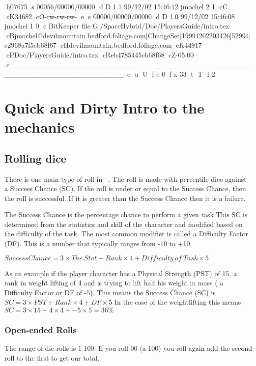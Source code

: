 h07675
s 00056/00000/00000
d D 1.1 99/12/02 15:46:12 jmochel 2 1
cC
cK34682
cO-rw-rw-rw-
e
s 00000/00000/00000
d D 1.0 99/12/02 15:46:08 jmochel 1 0
c BitKeeper file G:/SpaceHybrid/Doc/PlayersGuide/intro.tex
cBjmochel@devilmountain.bedford.foliage.com|ChangeSet|19991202203126|52994|e2968a7f5cb68f67
cHdevilmountain.bedford.foliage.com
cK44917
cPDoc/PlayersGuide/intro.tex
cReb4785445cb68f68
cZ-05:00
c______________________________________________________________________
e
u
U
f e 0
f x 33
t
T
I 2
\chapter{Quick and Dirty Intro to the mechanics}

\section{Rolling dice}

There is one main type of roll in \SH\ . The roll is 
made with percentile dice against a Success Chance (SC). If the roll 
is under or equal to the Success Chance, then the roll is successful.
If it is greater than the Success Chance then it is a failure.

The Success Chance is the percentage chance to perform a given task This SC is
determined from the statistics and skill of the character 
and modified based on the difficulty of the task. The most common 
modifier is called a Difficulty Factor (DF). This is a number that typically 
ranges from -10 to +10.

$ {Success Chance} = 3 \times {The\ Stat} + Rank \times 4 + {Difficulty\ of\ Task} \times 5 $

As an example if the player character has a Physical Strength (PST) of 15, a rank in 
weight lifting of 4 and is trying to lift half his weight in mass ( a Difficulty Factor or DF of -5). 
This means the Success Chance (SC) is $ SC = 3 \times PST + Rank \times 4 + DF \times 5 $
In the case of the weightlifting this means $ SC = 3 \times 15 + 4 \times 4 + -5 \times 5  = 36\% $

\subsection{Open-ended Rolls}

The range of die rolls is 1-100. If you roll 00 (a 100) you roll again add
the second roll to the first to get our total.

